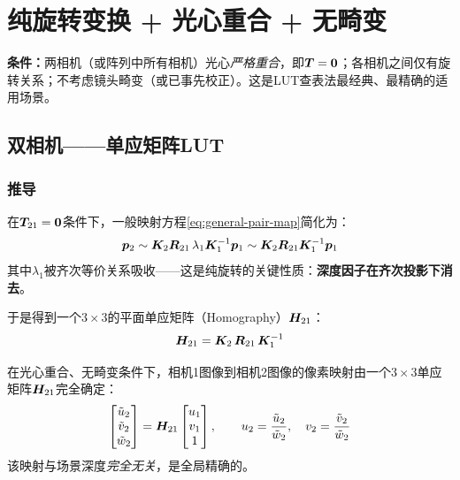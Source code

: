 \section{纯旋转变换 + 光心重合 + 无畸变}
\label{sec:rotate-only}

\textbf{条件：}两相机（或阵列中所有相机）光心\emph{严格重合}，即$\bm{T} = \bm{0}$；各相机之间仅有旋转关系；不考虑镜头畸变（或已事先校正）。这是LUT查表法最经典、最精确的适用场景。

\subsection{双相机——单应矩阵LUT}
\label{sec:dual-rot}

\subsubsection{推导}

在$\bm{T}_{21} = \bm{0}$条件下，一般映射方程\eqref{eq:general-pair-map}简化为：
\begin{equation}
\bm{p}_2 \sim \bm{K}_2 \bm{R}_{21}\, \lambda_1 \bm{K}_1^{-1} \bm{p}_1
      \sim \bm{K}_2 \bm{R}_{21} \bm{K}_1^{-1} \bm{p}_1
\label{eq:rot-only-p2}
\end{equation}
其中$\lambda_1$被齐次等价关系吸收——这是纯旋转的关键性质：\textbf{深度因子在齐次投影下消去}。

于是得到一个$3\times 3$的平面单应矩阵（Homography）$\bm{H}_{21}$：
\begin{equation}
\bm{H}_{21} = \bm{K}_2\,\bm{R}_{21}\,\bm{K}_1^{-1}
\label{eq:H21}
\end{equation}

\begin{theorem}[纯旋转双相机映射]
在光心重合、无畸变条件下，相机1图像到相机2图像的像素映射由一个$3\times 3$单应矩阵$\bm{H}_{21}$完全确定：
\begin{equation}
\begin{bmatrix}
\tilde{u}_2 \\ \tilde{v}_2 \\ \tilde{w}_2
\end{bmatrix}
=
\bm{H}_{21}
\begin{bmatrix}
u_1 \\ v_1 \\ 1
\end{bmatrix},
\qquad
u_2 = \frac{\tilde{u}_2}{\tilde{w}_2},\quad
v_2 = \frac{\tilde{v}_2}{\tilde{w}_2}
\label{eq:H21-explicit}
\end{equation}
该映射与场景深度\emph{完全无关}，是全局精确的。
\end{theorem}

